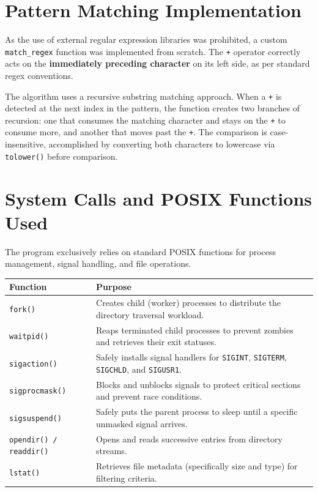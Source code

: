 \documentclass[12pt,a4paper]{article}
\begin{document}
\section{Pattern Matching Implementation}
As the use of external regular expression libraries was prohibited, a custom \texttt{match\_regex} function was implemented from scratch. The \texttt{+} operator correctly acts on the \textbf{immediately preceding character} on its left side, as per standard regex conventions.

The algorithm uses a recursive substring matching approach. When a \texttt{+} is detected at the next index in the pattern, the function creates two branches of recursion: one that consumes the matching character and stays on the \texttt{+} to consume more, and another that moves past the \texttt{+}. The comparison is case-insensitive, accomplished by converting both characters to lowercase via \texttt{tolower()} before comparison.

\section{System Calls and POSIX Functions Used}
The program exclusively relies on standard POSIX functions for process management, signal handling, and file operations.
\vspace{0.5cm}

\noindent
\begin{tabularx}{\textwidth}{|l|X|}
\hline
\textbf{Function} & \textbf{Purpose} \\
\hline
\texttt{fork()} & Creates child (worker) processes to distribute the directory traversal workload. \\
\hline
\texttt{waitpid()} & Reaps terminated child processes to prevent zombies and retrieves their exit statuses. \\
\hline
\texttt{sigaction()} & Safely installs signal handlers for \texttt{SIGINT}, \texttt{SIGTERM}, \texttt{SIGCHLD}, and \texttt{SIGUSR1}. \\
\hline
\texttt{sigprocmask()} & Blocks and unblocks signals to protect critical sections and prevent race conditions. \\
\hline
\texttt{sigsuspend()} & Safely puts the parent process to sleep until a specific unmasked signal arrives. \\
\hline
\texttt{opendir() / readdir()} & Opens and reads successive entries from directory streams. \\
\hline
\texttt{lstat()} & Retrieves file metadata (specifically size and type) for filtering criteria. \\
\hline
\end{tabularx}
\end{document}
